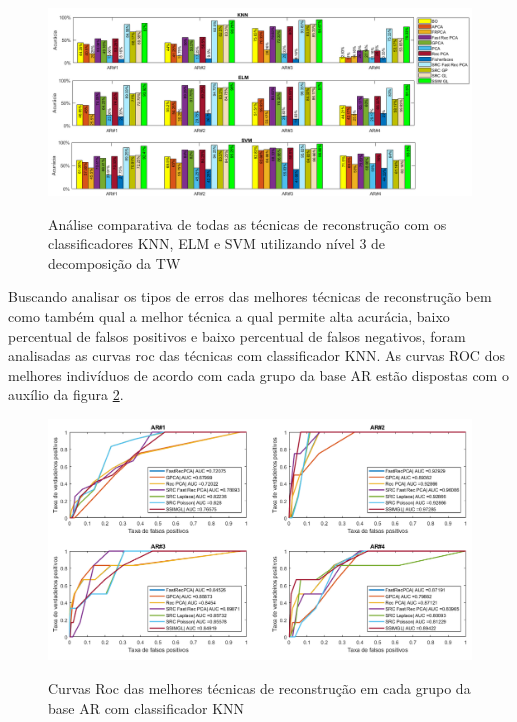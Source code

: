 \begin{figure}[H]
\centering
\caption{Análise comparativa de todas as técnicas de reconstrução com os classificadores KNN, ELM e SVM utilizando nível 3 de decomposição da TW }
\includegraphics[scale=0.45]{imgs4/acuracia/acuracia_geral}
\label{fig:comparacao_todas_tecnicas}
\end{figure}


Buscando analisar os tipos de erros das melhores técnicas de reconstrução bem como também qual a melhor técnica a qual permite alta acurácia, baixo percentual de falsos positivos e baixo percentual de falsos negativos, foram analisadas as curvas roc das técnicas com classificador KNN. As curvas ROC  dos melhores indivíduos de acordo com cada grupo da base AR estão dispostas com o auxílio da figura \ref{fig:curvas_roc_AR_KNN}.

\begin{figure}[H]
\centering
\caption{Curvas Roc das melhores técnicas de reconstrução em cada grupo da base AR com classificador KNN}
\includegraphics[scale=0.45]{imgs4/curvas/roc_AR_KNN.png}
\label{fig:curvas_roc_AR_KNN}
\end{figure}

